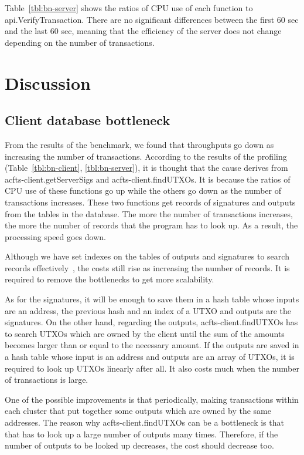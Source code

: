 \documentclass[a4paper, oneside]{discothesis}
\begin{document}
Table~\ref{tbl:bn-server} shows the ratios of CPU use of each function to api.VerifyTransaction.
There are no significant differences between the first 60 sec and the last 60 sec,
meaning that the efficiency of the server does not change
depending on the number of transactions.

\section{Discussion}

\subsection{Client database bottleneck}
From the results of the benchmark, we found that throughputs go down
as increasing the number of transactions.
According to the results of the profiling (Table~\ref{tbl:bn-client}, \ref{tbl:bn-server}),
it is thought that the cause derives from acfts-client.getServerSigs and acfts-client.findUTXOs.
It is because the ratios of CPU use of these functions go up
while the others go down as the number of transactions increases.
These two functions get records of signatures and outputs from the tables in the database.
The more the number of transactions increases,
the more the number of records that the program has to look up.
As a result, the processing speed goes down.

Although we have set indexes on the tables of outputs and signatures
to search records effectively~\cite{mysql, multiple},
the costs still rise as increasing the number of records.
It is required to remove the bottlenecks to get more scalability.

As for the signatures, it will be enough to save them in a hash table whose inputs are
an address, the previous hash and an index of a UTXO and outputs are the signatures.
On the other hand, regarding the outputs, acfts-client.findUTXOs has to search UTXOs
which are owned by the client until the sum of the amounts becomes larger than or equal to
the necessary amount.
If the outputs are saved in a hash table whose input is an address and outputs are
an array of UTXOs, it is required to look up UTXOs linearly after all.
It also costs much when the number of transactions is large.

One of the possible improvements is that periodically, making transactions
within each cluster that put together some outputs which are owned by the same addresses.
The reason why acfts-client.findUTXOs can be a bottleneck is that that has to
look up a large number of outputs many times.
Therefore, if the number of outputs to be looked up decreases, the cost should decrease too.
\end{document}
